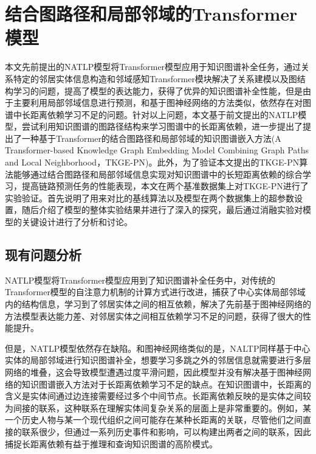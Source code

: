 \chapter{结合图路径和局部邻域的Transformer模型}


本文先前提出的NATLP模型将Transformer模型应用于知识图谱补全任务，通过关系特定的邻居实体信息构造和邻域感知Transformer模块解决了关系建模以及图结构学习的问题，提高了模型的表达能力，获得了优异的知识图谱补全性能，但是由于主要利用局部邻域信息进行预测，和基于图神经网络的方法类似，依然存在对图谱中长距离依赖学习不足的问题。针对以上问题，本文基于前文提出的NATLP模型，尝试利用知识图谱的图路径结构来学习图谱中的长距离依赖，进一步提出了提出了一种基于Transformer的结合图路径和局部邻域的知识图谱嵌入方法(A Transformer-based Knowledge Graph Embedding Model Combining Graph Paths and Local Neighborhood，TKGE-PN)。此外，为了验证本文提出的TKGE-PN算法能够通过结合图路径和局部邻域信息实现对知识图谱中的长短距离依赖的综合学习，提高链路预测任务的性能表现，本文在两个基准数据集上对TKGE-PN进行了实验验证。首先说明了用来对比的基线算法以及模型在两个数据集上的超参数设置，随后介绍了模型的整体实验结果并进行了深入的探究，最后通过消融实验对模型的关键设计进行了分析和讨论。

\section{现有问题分析}
NATLP模型将Transformer模型应用到了知识图谱补全任务中，对传统的Transformer模型的自注意力机制的计算方式进行改进，捕获了中心实体局部邻域内的结构信息，学习到了邻居实体之间的相互依赖，解决了先前基于图神经网络的方法模型表达能力差、对邻居实体之间相互依赖学习不足的问题，获得了很大的性能提升。

但是，NATLP模型依然存在缺陷。和图神经网络类似的是，NALTP同样基于中心实体的局部邻域进行知识图谱补全，想要学习多跳之外的邻居信息就需要进行多层网络的堆叠，这会导致模型遭遇过度平滑问题，因此模型并没有解决基于图神经网络的知识图谱嵌入方法对于长距离依赖学习不足的缺点。在知识图谱中，长距离的含义是实体间通过边连接需要经过多个中间节点。长距离依赖反映的是实体之间较为间接的联系，这种联系在理解实体间复杂关系的层面上是非常重要的。例如，某一个历史人物与某一个现代组织之间可能存在某种长距离的关联，尽管他们之间直接的联系很少，但通过一系列历史事件和影响，可以构建出两者之间的联系，因此捕捉长距离依赖有益于推理和查询知识图谱的高阶模式。

